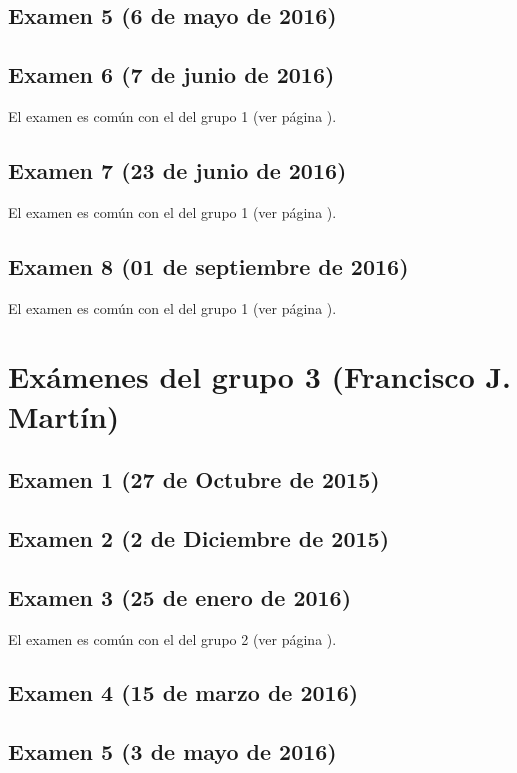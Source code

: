 \documentclass[a4paper,12pt,twoside]{book}
\begin{document}
\subsection{Examen 5 (6 de mayo de 2016)}
\subsection{Examen 6 (7 de junio de 2016)}
El examen es común con el del grupo 1 (ver página \pageref{examen_15_16_4_6}).
\subsection{Examen 7 (23 de junio de 2016)}
El examen es común con el del grupo 1 (ver página \pageref{examen_15_16_4_7}).
\subsection{Examen 8 (01 de septiembre de 2016)}
El examen es común con el del grupo 1 (ver página \pageref{examen_15_16_4_8}).

\section{Exámenes del grupo 3 (Francisco J. Martín)}
\subsection{Examen 1 (27 de Octubre de 2015)}
\subsection{Examen 2 (2 de Diciembre de 2015)}
\subsection{Examen 3 (25 de enero de 2016)}
El examen es común con el del grupo 2 (ver página \pageref{examen_15_16_2_3}).
\subsection{Examen 4 (15 de marzo de 2016)}
\subsection{Examen 5 (3 de mayo de 2016)}
\end{document}
